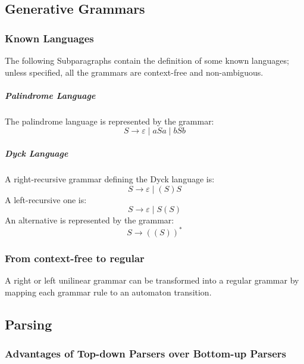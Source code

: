 \documentclass[english]{article}
\begin{document}
\subsection{Generative Grammars}

\subsubsection{Known Languages}

The following Subparagraphs contain the definition of some known languages;
unless specified, all the grammars are context-free and non-ambiguous.

\subparagraph*{Palindrome Language}
The palindrome language is represented by the grammar: \[ S \rightarrow \varepsilon \mid a S a \mid b S b \]

\subparagraph*{Dyck Language}
A right-recursive grammar defining the Dyck language is: \[ S \rightarrow \varepsilon \mid ( S ) S \]
A left-recursive one is: \[ S \rightarrow \varepsilon \mid S ( S ) \]
An alternative is represented by the grammar: \[ S \rightarrow \left( ( S ) \right)^\ast \]

\subsubsection{From context-free to regular}

A right or left unilinear grammar can be transformed into a regular grammar by mapping each grammar rule to an automaton transition.

\subsection{Parsing}

\subsubsection{Advantages of Top-down Parsers over Bottom-up Parsers}
\end{document}
